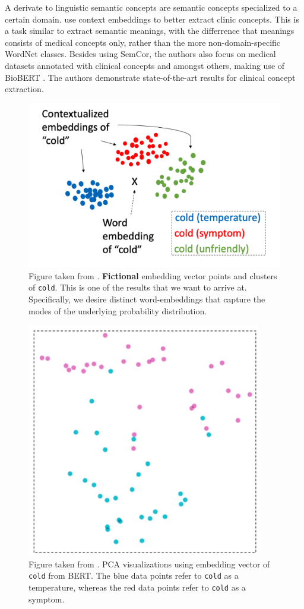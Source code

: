 \documentclass[a4paper,12pt,twoside,openright]{report}
\begin{document}
A derivate to linguistic semantic concepts are semantic concepts specialized to a certain domain.
\cite{si19} use context embeddings to better extract clinic concepts. 
This is a task similar to extract semantic meanings, with the differrence that meanings consists of medical concepts only, rather than the more non-domain-specific WordNet classes.
Besides using SemCor, the authors also focus on medical datasets annotated with clinical concepts and amongst others, making use of BioBERT \cite{lee19}.
The authors demonstrate state-of-the-art results for clinical concept extraction. \\

\begin{figure}[H]
	\center
  \includegraphics[width=0.4\linewidth]{./assets/relatedwork/cold_fictional_desired.png}
  \caption{Figure taken from \cite{si19}. \textbf{Fictional} embedding vector points and clusters of \texttt{cold}. This is one of the results that we want to arrive at.
  Specifically, we desire distinct word-embeddings that capture the modes of the underlying probability distribution. }
  \label{fig:cold_fictional_desired}
\end{figure}

\begin{figure}[H]
	\center
  \includegraphics[width=0.3\linewidth]{./assets/relatedwork/cold_biobert.png}
  \caption{Figure taken from \cite{si19}. PCA visualizations using embedding vector of \texttt{cold} from BERT. The blue data points refer to \texttt{cold} as a temperature, whereas the red data points refer to \texttt{cold} as a symptom.}
  \label{fig:cold_fictional_desired}
\end{figure}

\end{document}
